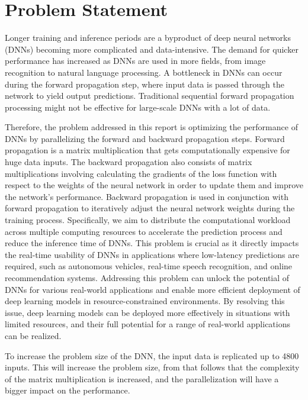 \documentclass[11pt]{article}
\begin{document}
\section{Problem Statement}

Longer training and inference periods are a byproduct of deep neural networks (DNNs) becoming more complicated and data-intensive. The demand for quicker performance has increased as DNNs are used in more fields, from image recognition to natural language processing. A bottleneck in DNNs can occur during the forward propagation step, where input data is passed through the network to yield output predictions. Traditional sequential forward propagation processing might not be effective for large-scale DNNs with a lot of data.

\bigskip

Therefore, the problem addressed in this report is optimizing the performance of DNNs by parallelizing the forward and backward propagation steps. Forward propagation is a matrix multiplication that gets computationally expensive for huge data inputs.  The backward propagation also consists of matrix multiplications involving calculating the gradients of the loss function with respect to the weights of the neural network in order to update them and improve the network's performance. Backward propagation is used in conjunction with forward propagation to iteratively adjust the neural network weights during the training process. Specifically, we aim to distribute the computational workload across multiple computing resources to accelerate the prediction process and reduce the inference time of DNNs. This problem is crucial as it directly impacts the real-time usability of DNNs in applications where low-latency predictions are required, such as autonomous vehicles, real-time speech recognition, and online recommendation systems. Addressing this problem can unlock the potential of DNNs for various real-world applications and enable more efficient deployment of deep learning models in resource-constrained environments. By resolving this issue, deep learning models can be deployed more effectively in situations with limited resources, and their full potential for a range of real-world applications can be realized.

\bigskip

To increase the problem size of the DNN, the input data is replicated up to 4800 inputs. This will increase the problem size, from that follows that the complexity of the matrix multiplication is increased, and the parallelization will have a bigger impact on the performance. 
\end{document}
